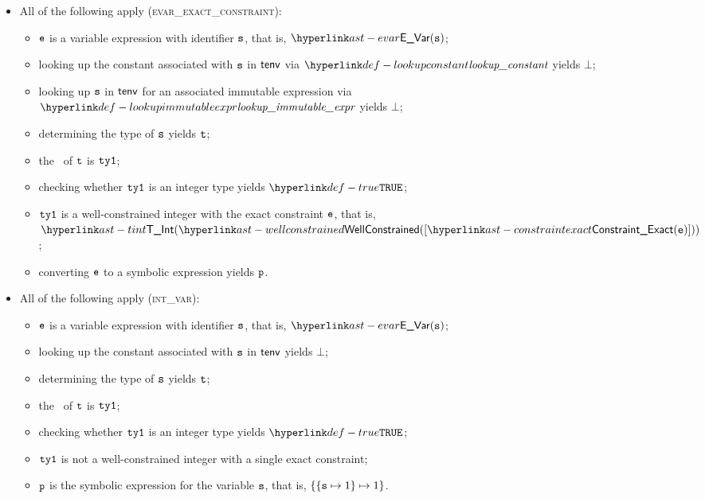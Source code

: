 \begin{itemize}
  \item All of the following apply (\textsc{evar\_exact\_constraint}):
  \begin{itemize}
    \item $\texttt{e}$ is a variable expression with identifier $\texttt{s}$, that is, $\EVar(\vs)$;
    \item looking up the constant associated with $\texttt{s}$ in $\textsf{tenv}$ via $\lookupconstant$ yields $\bot$;
    \item looking up $\texttt{s}$ in $\textsf{tenv}$ for an associated immutable expression via \\
          $\lookupimmutableexpr$ yields $\bot$;
    \item determining the type of $\texttt{s}$ yields $\texttt{t}$\ProseOrTypeError;
    \item the \underlyingtype\ of $\texttt{t}$ is $\texttt{ty1}$\ProseOrTypeError;
    \item checking whether $\texttt{ty1}$ is an integer type yields $\True$\ProseOrTypeError;
    \item $\texttt{ty1}$ is a well-constrained integer with the exact constraint $\texttt{e}$, that is, \\ $\TInt(\wellconstrained([\ConstraintExact(\ve)]))$;
    \item converting $\texttt{e}$ to a symbolic expression yields $\texttt{p}$\ProseTerminateAs{\CannotBeTransformed}.
  \end{itemize}

  \item All of the following apply (\textsc{int\_var}):
  \begin{itemize}
    \item $\texttt{e}$ is a variable expression with identifier $\texttt{s}$, that is, $\EVar(\vs)$;
    \item looking up the constant associated with $\texttt{s}$ in $\textsf{tenv}$ yields $\bot$;
    \item determining the type of $\texttt{s}$ yields $\texttt{t}$\ProseOrTypeError;
    \item the \underlyingtype\ of $\texttt{t}$ is $\texttt{ty1}$\ProseOrTypeError;
    \item checking whether $\texttt{ty1}$ is an integer type yields $\True$\ProseOrTypeError;
    \item $\texttt{ty1}$ is not a well-constrained integer with a single exact constraint;
    \item $\texttt{p}$ is the symbolic expression for the variable $\texttt{s}$, that is, $\{ \{\texttt{s}\mapsto 1\}\mapsto 1 \}$.
  \end{itemize}


\end{itemize}
